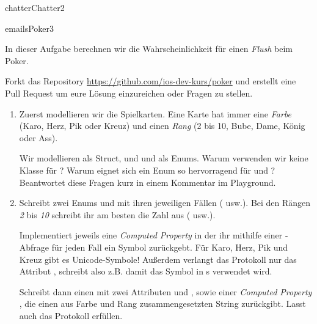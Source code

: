 \documentclass[parskip=half, final]{scrreprt}
\begin{document}
\begin{lecture}
\begin{exc}
\begin{excitem}{chatter}{Chatter}{2}
\begin{enumerate}[label=\roman*.]
\end{enumerate}

\end{excitem}


\begin{excitem}{emails}{Poker}{3}

In dieser Aufgabe berechnen wir die Wahrscheinlichkeit für einen \emph{Flush} beim Poker.

Forkt das Repository \url{https://github.com/ios-dev-kurs/poker} und erstellt eine Pull Request um eure Lösung einzureichen oder Fragen zu stellen.

\begin{enumerate}[label=\roman*.]

\item Zuerst modellieren wir die Spielkarten. Eine Karte  hat immer eine \emph{Farbe}  (Karo, Herz, Pik oder Kreuz) und einen \emph{Rang}  (2 bis 10, Bube, Dame, König oder Ass).

Wir modellieren  als Struct, und  und  als Enums. Warum verwenden wir keine Klasse für ? Warum eignet sich ein Enum so hervorragend für  und ? Beantwortet diese Fragen kurz in einem Kommentar im Playground.

\item Schreibt zwei Enums  und  mit ihren jeweiligen Fällen ( usw.). Bei den Rängen \emph{2} bis \emph{10} schreibt ihr am besten die Zahl aus ( usw.).

Implementiert jeweils eine \emph{Computed Property}  in der ihr mithilfe einer -Abfrage für jeden Fall ein Symbol zurückgebt.  Für Karo, Herz, Pik und Kreuz gibt es Unicode-Symbole! Außerdem verlangt das Protokoll  nur das Attribut , schreibt also z.B.  damit das Symbol in s verwendet wird.
	
Schreibt dann einen  mit zwei Attributen  und , sowie einer \emph{Computed Property} , die einen aus Farbe und Rang zusammengesetzten String zurückgibt. Lasst auch  das  Protokoll erfüllen.
		

\end{enumerate}
\end{excitem}
\end{exc}
\end{lecture}
\end{document}
